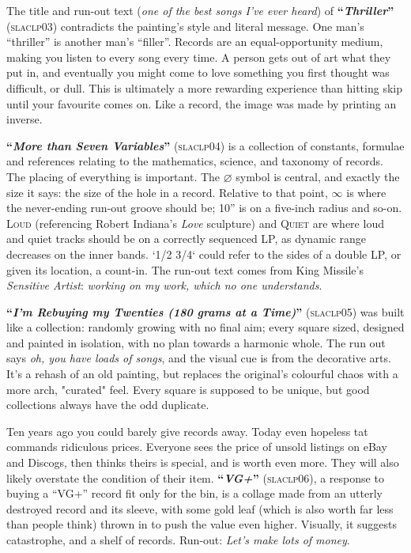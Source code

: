 \documentclass[a3paper]{article}
\def\inch#1{#1''}
\begin{document}
\begin{multicols}{5}
The title and run-out text (\textit{one of the best songs I've ever heard}) of
  \textbf{``\textit{Thriller}''} (\textsc{slaclp03}) contradicts the
  painting's style and literal message.  One  man's ``thriller'' is another
  man's ``filler''.  Records are an equal-opportunity medium, making you
  listen to every song every time. A person gets out of art what they put in,
  and eventually you might come to love something you first thought was
  difficult, or dull. This is ultimately a more rewarding experience than
  hitting skip until your favourite comes on. Like a record, the image was
  made by printing an inverse.

\textbf{``\textit{More than Seven Variables}''} (\textsc{slaclp04}) is a
  collection of constants, formulae and references relating to the
  mathematics, science, and taxonomy of records. The placing of everything is
  important. The $ \diameter $ symbol is central, and exactly the size it
  says: the size of the hole in a record.  Relative to that point, $ \infty $
  is where the never-ending run-out groove should be; \inch{10} is on a
  five-inch radius and so-on.  \textsc{Loud} (referencing Robert Indiana's
  \textit{Love} sculpture) and \textsc{Quiet} are where loud and quiet tracks
  should be on a correctly sequenced LP, as dynamic range decreases on the
  inner bands.  `1/2 3/4` could refer to the sides of a double LP, or given
  its location, a count-in.  The run-out text comes from King Missile's
  \textit{Sensitive Artist}: \textit{working on my work, which no one
  understands}.

\textbf{``\textit{I'm Rebuying my Twenties (180 grams at a Time)}''}
  (\textsc{slaclp05}) was built like a collection: randomly growing with no
  final aim; every square sized, designed and painted in isolation, with no
  plan towards a harmonic whole.  The run out says \textit{oh, you have loads
  of songs}, and the visual cue is from the decorative arts.  It's a rehash of
  an old painting, but replaces the original's colourful chaos with a more
  arch, "curated" feel.  Every square is supposed to be unique, but good
  collections always have the odd duplicate.

Ten years ago you could barely give records away.  Today even hopeless tat
  commands ridiculous prices. Everyone sees the price of unsold listings on
  eBay and Discogs, then thinks theirs is special, and is worth even more.
  They will also likely overstate the condition of their item.
  \textbf{``\textit{VG+}''} (\textsc{slaclp06}), a response to buying a
  ``VG+'' record fit only for the bin,  is a collage made from an utterly
  destroyed record and its sleeve, with some gold leaf (which is also worth
  far less than people think) thrown in to push the value even higher.
  Visually, it suggests catastrophe, and a shelf of records.  Run-out:
  \textit{Let's make lots of money}.


\end{multicols}
\end{document}
